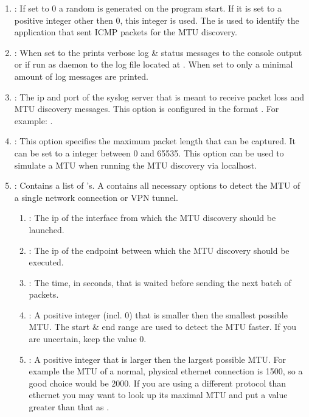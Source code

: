 \begin{enumerate}
  \item {}: If set to 0 a random  is generated on the program start. If it is set to a positive integer other then 0, this integer is used. The  is used to identify the application that sent \acs{ICMP} packets for the \acs{MTU} discovery.
  \item {}: When set to  the \entool{} prints verbose log \& status messages to the console output or if run as daemon to the log file located at . When set to  only a minimal amount of log messages are printed.
  \item {}: The ip and port of the syslog server that is meant to receive packet loss and \acs{MTU} discovery messages. This option is configured in the format . For example: .
  \item {}: This option specifies the maximum packet length that can be captured. It can be set to a integer between 0 and 65535. This option can be used to simulate a \acs{MTU} when running the \acs{MTU} discovery via localhost.
  \item {}: Contains a list of 's. A  contains all necessary options to detect the \acs{MTU} of a single network connection or \acs{VPN} tunnel.
  \begin{enumerate}
	  \item {}: The ip of the interface from which the \acs{MTU} discovery should be launched.
	  \item {}: The ip of the endpoint between which the \acs{MTU} discovery should be executed.
	  \item {}: The time, in seconds, that is waited before sending the next batch of packets.
	  \item {}: A positive integer (incl. 0) that is smaller then the smallest possible \acs{MTU}. The start \& end range are used to detect the \acs{MTU} faster. If you are uncertain, keep the value 0.
	  \item {}: A positive integer that is larger then the largest possible \acs{MTU}. For example the \acs{MTU} of a normal, physical ethernet connection is 1500, so a good choice would be 2000. If you are using a different protocol than ethernet you may want to look up its maximal \acs{MTU} and put a value greater than that as .

\end{enumerate}
\end{enumerate}
